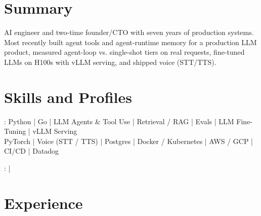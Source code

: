 \documentclass[print]{jack-resume}
\begin{document}
\pagecolor{darkmodeBackground}


\begin{minipage}[t][1cm][t]{.03\textwidth}
    \hfill
\end{minipage}

\section{Summary}
AI engineer and two-time founder/CTO with seven years of production systems. Most recently built agent tools and agent-runtime memory for a production LLM product, measured agent-loop vs. single-shot tiers on real requests, fine-tuned LLMs on H100s with vLLM serving, and shipped voice (STT/TTS).
\sectionsep

\section{Skills and Profiles}
:
Python \hfill | \hfill
Go \hfill | \hfill
LLM Agents \& Tool Use \hfill | \hfill
Retrieval / RAG \hfill | \hfill
Evals \hfill | \hfill
LLM Fine-Tuning \hfill | \hfill
vLLM Serving \\
\hspace{1.0cm} PyTorch \hfill | \hfill
Voice (STT / TTS) \hfill | \hfill
Postgres \hfill | \hfill
Docker / Kubernetes \hfill | \hfill
AWS / GCP \hfill | \hfill
CI/CD \hfill | \hfill
Datadog \\

\raggedright{
    :
      \href{https://www.linkedin.com/in/jack-sturtevant/}{ \ExternalLink} |
     \href{https://github.com/jacksturt}{ \ExternalLink}}

\section{Experience}
\end{document}
